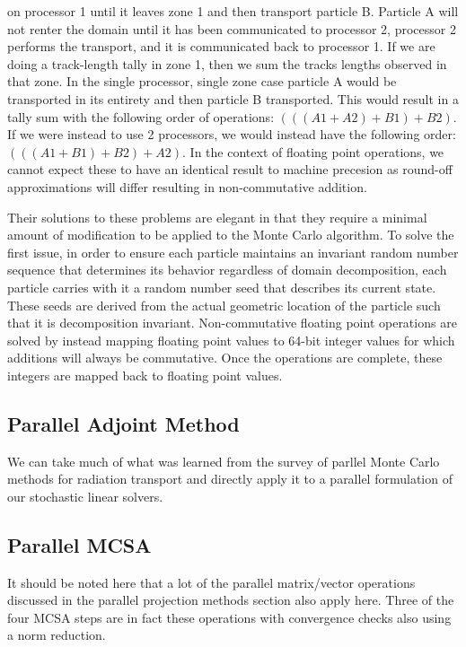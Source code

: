 on processor 1 until it leaves zone 1 and then transport particle
B. Particle A will not renter the domain until it has been
communicated to processor 2, processor 2 performs the transport, and
it is communicated back to processor 1. If we are doing a track-length
tally in zone 1, then we sum the tracks lengths observed in that
zone. In the single processor, single zone case particle A would be
transported in its entirety and then particle B transported. This
would result in a tally sum with the following order of operations:
$(((A1+A2)+B1)+B2)$. If we were instead to use 2 processors, we would
instead have the following order: $(((A1+B1)+B2)+A2)$. In the context
of floating point operations, we cannot expect these to have an
identical result to machine precesion as round-off approximations will
differ resulting in non-commutative addition.

Their solutions to these problems are elegant in that they require a
minimal amount of modification to be applied to the Monte Carlo
algorithm. To solve the first issue, in order to ensure each particle
maintains an invariant random number sequence that determines its
behavior regardless of domain decomposition, each particle carries
with it a random number seed that describes its current state. These
seeds are derived from the actual geometric location of the particle
such that it is decomposition invariant. Non-commutative floating
point operations are solved by instead mapping floating point values
to 64-bit integer values for which additions will always be
commutative. Once the operations are complete, these integers are
mapped back to floating point values.

\subsection{Parallel Adjoint Method}
\label{subsec:parallel_adjoint}
We can take much of what was learned from the survey of parllel Monte
Carlo methods for radiation transport and directly apply it to a
parallel formulation of our stochastic linear solvers.

\subsection{Parallel MCSA}
\label{subsec:parallel_mcsa}
It should be noted here that a lot of the parallel matrix/vector
operations discussed in the parallel projection methods section also
apply here. Three of the four MCSA steps are in fact these operations
with convergence checks also using a norm reduction.
